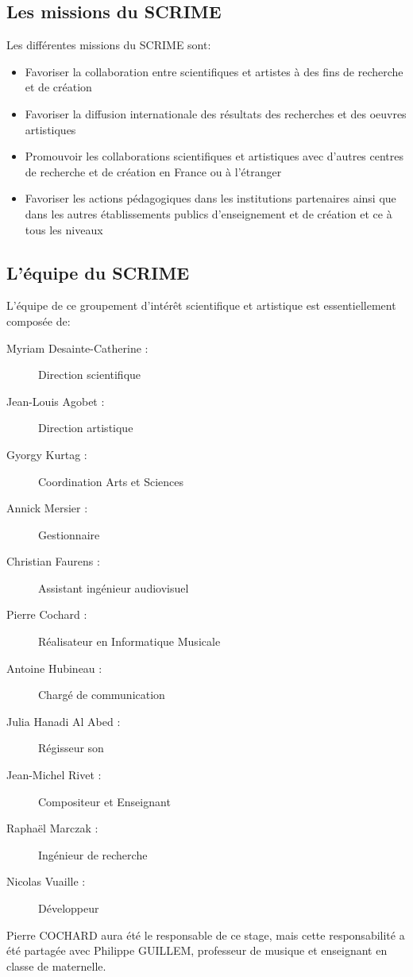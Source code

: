\documentclass[a4paper, 12pt]{report}
\begin{document}
\subsection{Les missions du SCRIME \pageref{SCRIME}}
Les différentes missions du SCRIME \cite{SCRIME2016} sont:
\begin{itemize}
\item Favoriser la collaboration entre scientifiques et artistes à des fins de recherche et de création
\item Favoriser la diffusion internationale des résultats des recherches et des oeuvres artistiques
\item Promouvoir les collaborations scientifiques et artistiques avec d'autres centres de recherche et de création en France ou à l'étranger
\item Favoriser les actions pédagogiques dans les institutions partenaires ainsi que dans les autres établissements publics d'enseignement et de création et ce à tous les niveaux 
\end{itemize}

\subsection{L'équipe du SCRIME \pageref{SCRIME}}
L'équipe de ce groupement d'intérêt scientifique et artistique est essentiellement composée de:
\begin{description}
\item[Myriam Desainte-Catherine :] Direction scientifique
\item[Jean-Louis Agobet :] Direction artistique
\item[Gyorgy Kurtag :] Coordination Arts et Sciences
\item[Annick Mersier :] Gestionnaire
\item[Christian Faurens :] Assistant ingénieur audiovisuel
\item[Pierre Cochard :] Réalisateur en Informatique Musicale
\item[Antoine Hubineau :] Chargé de communication
\item[Julia Hanadi Al Abed :] Régisseur son
\item[Jean-Michel Rivet :] Compositeur et Enseignant
\item[Raphaël Marczak :] Ingénieur de recherche
\item[Nicolas Vuaille :] Développeur
\end{description}
Pierre COCHARD aura été le responsable de ce stage, mais cette responsabilité a été partagée avec Philippe GUILLEM, professeur de musique et enseignant en classe de maternelle.
\end{document}
